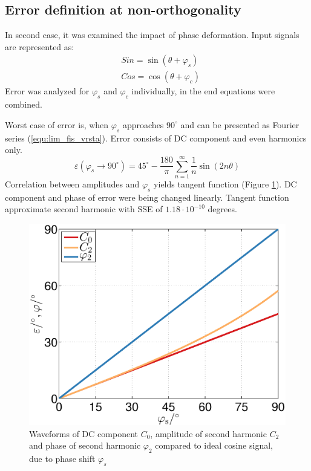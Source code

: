 \documentclass[a4paper]{article}
\begin{document}
\subsection{Error definition at non-orthogonality}
In second case, it was examined the impact of phase deformation. Input signals are represented as:
\begin{eqnarray}
\label{equ:def_sin_fis}
&Sin = \sin(\theta + \varphi_{s})\\
\label{equ:def_cos_fis}
&Cos =\cos(\theta+\varphi_{c})
\end{eqnarray}
Error was analyzed for $\varphi_s$ and $\varphi_c$ individually, in the end equations were combined.

Worst case of error is, when $\varphi_s$ approaches $90^\circ$ and can be presented as Fourier series (\ref{equ:lim_fis_vrsta}). Error consists of DC component and even harmonics only.
\begin{equation}
\label{equ:lim_fis_vrsta}
\varepsilon(\varphi_{s} \rightarrow 90^\circ) = 45^\circ - \frac{180}{\pi}\sum_{n=1}^{\infty}\frac{1}{n} \sin (2n \theta)
\end{equation}
Correlation between amplitudes and $\varphi_{s}$ yields tangent function (Figure \ref{fig:fis}). DC component and phase of error were being changed linearly. Tangent function approximate second harmonic with SSE of $1.18 \cdot 10^{-10}$ degrees.
\begin{figure}[!htb]
	\begin{center}
		\includegraphics[width=\linewidth]{./Slike/fis.eps}
		\caption{Waveforms of DC component $C_0$, amplitude of second harmonic  $C_2$ and phase of second harmonic $\varphi_2$ compared to ideal cosine signal, due to phase shift $\varphi_{s}$} \label{fig:fis}
	\end{center}
\end{figure}
\end{document}
